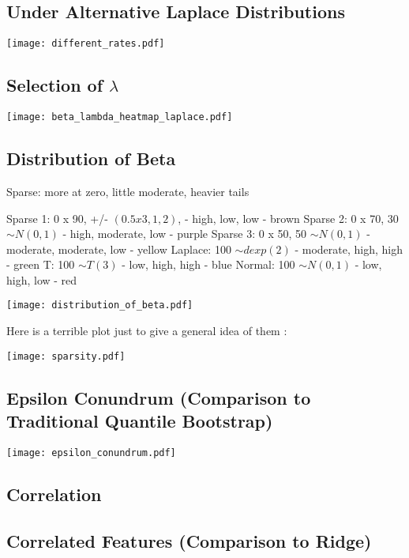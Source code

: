 \subsection{Under Alternative Laplace Distributions}

\texttt{[image: different\_rates.pdf]}

\subsection{Selection of \texorpdfstring{$\lambda$}{lambda}}

\texttt{[image: beta\_lambda\_heatmap\_laplace.pdf]}

\subsection{Distribution of Beta}

Sparse: more at zero, little moderate, heavier tails

Sparse 1: 0 x 90, +/- $(0.5 x 3, 1, 2)$,
- high, low, low  - brown
Sparse 2: 0 x 70, 30 $\sim N(0, 1)$
- high, moderate, low - purple
Sparse 3: 0 x 50, 50 $\sim N(0, 1)$
- moderate, moderate, low - yellow
Laplace: 100 $\sim dexp(2)$
- moderate, high, high - green
T: 100 $\sim T(3)$
- low, high, high - blue
Normal: 100 $\sim N(0, 1)$
- low, high, low - red

\texttt{[image: distribution\_of\_beta.pdf]}

Here is a terrible plot just to give a general idea of them :

\texttt{[image: sparsity.pdf]}

\subsection{Epsilon Conundrum (Comparison to Traditional Quantile Bootstrap)}

\texttt{[image: epsilon\_conundrum.pdf]}

\subsection{Correlation}

\subsection{Correlated Features (Comparison to Ridge)}


